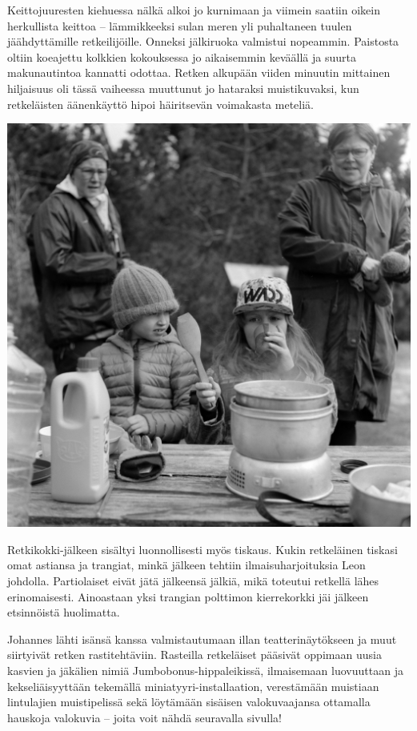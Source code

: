 \begin{multicols}{2}
	Keittojuuresten kiehuessa nälkä alkoi jo kurnimaan ja viimein saatiin
	oikein herkullista keittoa – lämmikkeeksi sulan meren yli puhaltaneen
	tuulen jäähdyttämille retkeilijöille. Onneksi jälkiruoka valmistui
	nopeammin. Paistosta oltiin koeajettu kolkkien kokouksessa jo
	aikaisemmin keväällä ja suurta makunautintoa kannatti odottaa. Retken
	alkupään viiden minuutin mittainen hiljaisuus oli tässä vaiheessa
	muuttunut jo hataraksi muistikuvaksi, kun retkeläisten äänenkäyttö
	hipoi häiritsevän voimakasta meteliä. 


	\begin{center}
		\noindent\includegraphics[width=0.8\linewidth]{assets/kolkkienpäiväretkibw14}
	\end{center}

	Retkikokki-jälkeen sisältyi luonnollisesti myös tiskaus. Kukin
	retkeläinen tiskasi omat astiansa ja trangiat, minkä jälkeen tehtiin
	ilmaisuharjoituksia Leon johdolla. Partiolaiset eivät jätä jälkeensä
	jälkiä, mikä toteutui retkellä lähes erinomaisesti. Ainoastaan yksi
	trangian polttimon kierrekorkki jäi jälkeen etsinnöistä huolimatta.


	Johannes lähti isänsä kanssa valmistautumaan illan teatterinäytökseen
	ja muut siirtyivät retken rastitehtäviin. Rasteilla retkeläiset
	pääsivät oppimaan uusia kasvien ja jäkälien nimiä
	Jumbobonus-hippaleikissä, ilmaisemaan luovuuttaan ja kekseliäisyyttään
	tekemällä miniatyyri-installaation, verestämään muistiaan lintulajien
	muistipelissä sekä löytämään sisäisen valokuvaajansa ottamalla hauskoja
	valokuvia – joita voit nähdä seuravalla sivulla!


\end{multicols}
